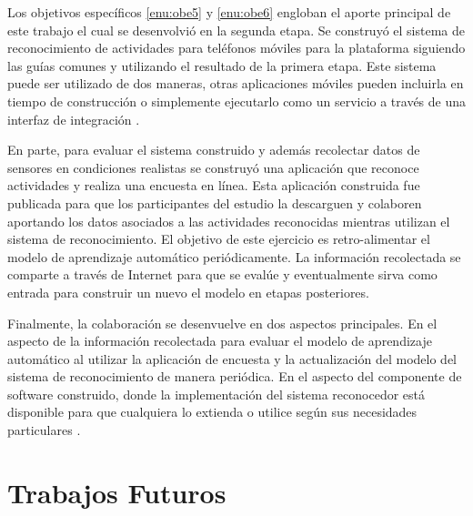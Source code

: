Los objetivos específicos \ref{enu:obe5} y \ref{enu:obe6} engloban
el aporte principal de este trabajo el cual se desenvolvió en la segunda
etapa. Se construyó el sistema de reconocimiento de actividades para
teléfonos móviles para la plataforma \emph{} siguiendo
las guías comunes y utilizando el resultado de la primera etapa. Este
sistema puede ser utilizado de dos maneras, otras aplicaciones móviles
pueden incluirla en tiempo de construcción o simplemente ejecutarlo
como un servicio a través de una interfaz de integración \cite{GimenezYegros2016a}.

En parte, para evaluar el sistema construido y además recolectar datos
de sensores en condiciones realistas se construyó una aplicación que
reconoce actividades y realiza una encuesta en línea. Esta aplicación
\emph{} construida fue publicada para que los participantes
del estudio la descarguen y colaboren aportando los datos asociados
a las actividades reconocidas mientras utilizan el sistema de reconocimiento.
El objetivo de este ejercicio es retro-alimentar el modelo de aprendizaje
automático periódicamente. La información recolectada se comparte
a través de Internet para que se evalúe y eventualmente sirva como
entrada para construir un nuevo el modelo en etapas posteriores.

Finalmente, la colaboración se desenvuelve en dos aspectos principales.
En el aspecto de la información recolectada para evaluar el modelo
de aprendizaje automático al utilizar la aplicación de encuesta y
la actualización del modelo del sistema de reconocimiento de manera
periódica. En el aspecto del componente de software construido, donde
la implementación del sistema reconocedor está disponible para que
cualquiera lo extienda o utilice según sus necesidades particulares
\cite{GimenezYegros2016b}.

\section{Trabajos Futuros}

\label{sec82:trabajos-futuros}

